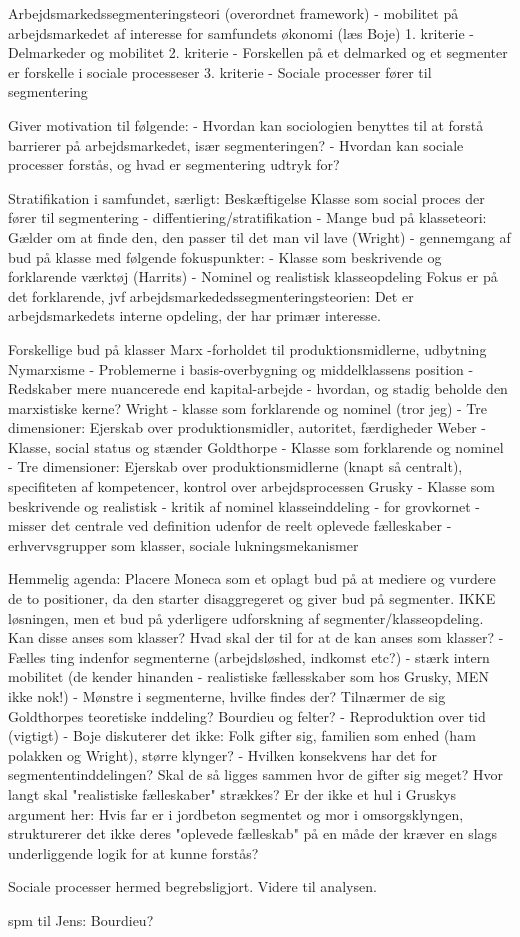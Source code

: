 

Arbejdsmarkedssegmenteringsteori (overordnet framework)
	- mobilitet på arbejdsmarkedet af interesse for samfundets økonomi (læs Boje)
	1. kriterie - Delmarkeder og mobilitet
	2. kriterie - Forskellen på et delmarked og et segmenter er forskelle i sociale processeser
	3. kriterie - Sociale processer fører til segmentering

Giver motivation til følgende:
	- Hvordan kan sociologien benyttes til at forstå barrierer på arbejdsmarkedet, især segmenteringen? 
	- Hvordan kan sociale processer forstås, og hvad er segmentering udtryk for?

Stratifikation i samfundet, særligt: Beskæftigelse
	Klasse som social proces der fører til segmentering - diffentiering/stratifikation
		- Mange bud på klasseteori: Gælder om at finde den, den passer til det man vil lave (Wright)
		- gennemgang af bud på klasse med følgende fokuspunkter:
			- Klasse som beskrivende og forklarende værktøj (Harrits)
			- Nominel og realistisk klasseopdeling
		Fokus er på det forklarende, jvf arbejdsmarkededssegmenteringsteorien: Det er arbejdsmarkedets interne opdeling, der har primær interesse. 

Forskellige bud på klasser
	Marx
		-forholdet til produktionsmidlerne, udbytning
	Nymarxisme	
		- Problemerne i basis-overbygning og middelklassens position
		- Redskaber mere nuancerede end kapital-arbejde - hvordan, og stadig beholde den marxistiske kerne? 
	Wright
		- klasse som forklarende og nominel (tror jeg)
		- Tre dimensioner: Ejerskab over produktionsmidler, autoritet, færdigheder
	Weber
		- Klasse, social status og stænder
	Goldthorpe
		- Klasse som forklarende og nominel
		- Tre dimensioner: Ejerskab over produktionsmidlerne (knapt så centralt), specifiteten af kompetencer, kontrol over arbejdsprocessen 
	Grusky
		- Klasse som beskrivende og realistisk
		- kritik af nominel klasseinddeling
			- for grovkornet
			- misser det centrale ved definition udenfor de reelt oplevede fælleskaber
		- erhvervsgrupper som klasser, sociale lukningsmekanismer

Hemmelig agenda: Placere Moneca som et oplagt bud på at mediere og vurdere de to positioner, da den starter disaggregeret og giver bud på segmenter. IKKE løsningen, men et bud på yderligere udforskning af segmenter/klasseopdeling. Kan disse anses som klasser? Hvad skal der til for at de kan anses som klasser?
		- Fælles ting indenfor segmenterne (arbejdsløshed, indkomst etc?)
		- stærk intern mobilitet (de kender hinanden - realistiske fællesskaber som hos Grusky, MEN ikke nok!)
		- Mønstre i segmenterne, hvilke findes der? Tilnærmer de sig Goldthorpes teoretiske inddeling? Bourdieu og felter?	
		- Reproduktion over tid (vigtigt)
		- Boje diskuterer det ikke: Folk gifter sig, familien som enhed (ham polakken og Wright), større klynger?
			- Hvilken konsekvens har det for segmententinddelingen? Skal de så ligges sammen hvor de gifter sig meget? Hvor langt skal "realistiske fælleskaber" strækkes? Er der ikke et hul i Gruskys argument her: Hvis far er i jordbeton segmentet og mor i omsorgsklyngen, strukturerer det ikke deres "oplevede fælleskab" på en måde der kræver en slags underliggende logik for at kunne forstås?

Sociale processer hermed begrebsligjort. Videre til analysen.






spm til Jens: Bourdieu?




